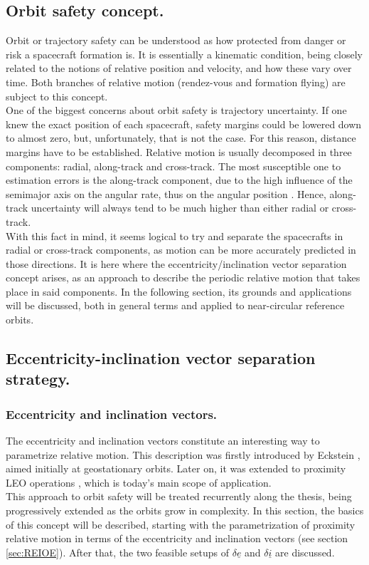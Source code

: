 	\subsection{Orbit safety concept.}\label{sec:Orbit_safety}
	\indent Orbit or trajectory safety can be understood as how protected from danger or risk a spacecraft formation is. It is essentially a kinematic condition, being closely related to the notions of relative position and velocity, and how these vary over time. Both branches of relative motion (\ie rendez-vous and formation flying) are subject to this concept. \\
	\indent One of the biggest concerns about orbit safety is trajectory uncertainty. If one knew the exact position of each spacecraft, safety margins could be lowered down to almost zero, but, unfortunately, that is not the case. For this reason, distance margins have to be established. Relative motion is usually decomposed in three components: radial, along-track and cross-track. The most susceptible one to estimation errors is the along-track component, due to the high influence of the semimajor axis on the angular rate, thus on the angular position \cite{Eckstein}. Hence, along-track uncertainty will always tend to be much higher than either radial or cross-track.\\
	\indent With this fact in mind, it seems logical to try and separate the spacecrafts in radial or cross-track components, as motion can be more accurately predicted in those directions. It is here where the eccentricity/inclination vector separation concept arises, as an approach to describe the periodic relative motion that takes place in said components. In the following section, its grounds and applications will be discussed, both in general terms and applied to near-circular reference orbits.
	\subsection{Eccentricity-inclination vector separation strategy.}\label{secCh2:E_I_separation}
		\subsubsection{Eccentricity and inclination vectors.}
		\indent The eccentricity and inclination vectors constitute an interesting way to parametrize relative motion. This description was firstly introduced by Eckstein \cite{Eckstein}, aimed initially at geostationary orbits. Later on, it was extended to proximity LEO operations \cite{Montenbruck_DAmico}, which is today's main scope of application. \\
		\indent This approach to orbit safety will be treated recurrently along the thesis, being progressively extended as the orbits grow in complexity. In this section, the basics of this concept will be described, starting with the parametrization of proximity relative motion in terms of the eccentricity and inclination vectors (see section \ref{sec:REIOE}). After that, the two feasible setups of $\delta \underline{e}$ and $\delta \underline{i}$ are discussed.
